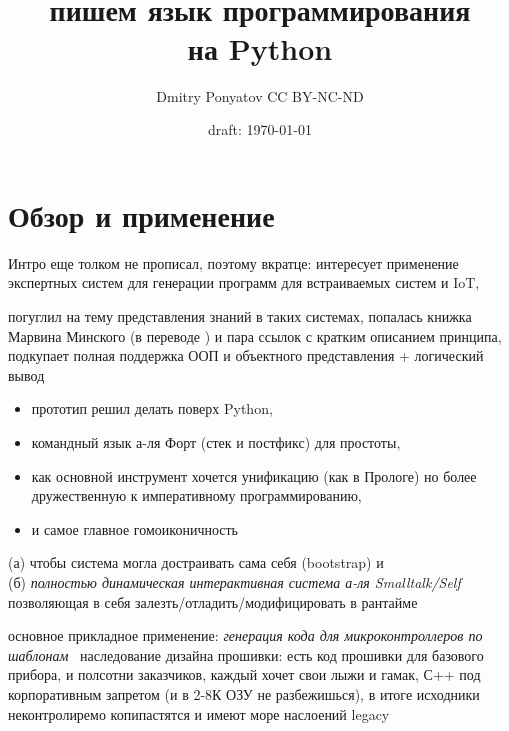

\author{Dmitry Ponyatov  CC BY-NC-ND}
\title{{\Huge \ \\\hico}\\пишем язык программирования\\на Python}
\date{draft: \today}



\maketitle
\tableofcontents



\part{Обзор и применение \hico}\secdown

Интро еще толком не прописал, поэтому вкратце:
интересует применение экспертных систем для генерации программ для встраиваемых
систем и IoT,

погуглил на тему представления знаний в таких системах, попалась
книжка Марвина Минского (в переводе \cite{minsky}) и пара ссылок с кратким
описанием принципа, подкупает полная поддержка ООП и объектного представления + логический вывод
\begin{itemize}[nosep]
  \item 
прототип решил делать поверх Python,
  \item 
командный язык а-ля Форт (стек и постфикс) для простоты,
  \item 
как основной инструмент хочется унификацию (как в Прологе) но более
дружественную к императивному программированию,
\clearpage
  \item 
и самое главное гомоиконичность\\
\end{itemize}
(а) чтобы система могла достраивать сама себя (bootstrap) и\\ 
(б) \emph{полностью динамическая интерактивная система а-ля Smalltalk/Self}\\
позволяющая в себя залезть/отладить/модифицировать в рантайме

\bigskip
\noindent
основное прикладное применение: \emph{генерация кода для микроконтроллеров по
шаблонам}\ 
наследование дизайна прошивки: есть код прошивки для базового прибора, и
полсотни заказчиков, каждый хочет свои лыжи и гамак, С++ под корпоративным
запретом (и в 2-8К ОЗУ не разбежишься), в итоге исходники неконтролиремо
копипастятся и имеют море наслоений legacy

